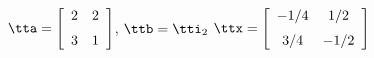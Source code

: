 {$\tta = \left[ \begin {array}{cc} 2&2 \\ \noalign{\medskip} 3&1  \end {array} \right] $,  \quad
$\ttb=\tti_2 $}
{$\ttx=\left[ \begin {array}{cc} -1/4 & 1/2 \\ \noalign{\medskip} 3/4 & -1/2  \end {array} \right] $}
